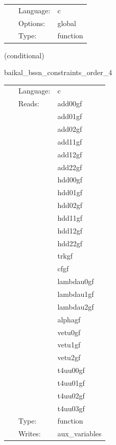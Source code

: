 \hspace{5mm}{\it register symmetries, the cartgrid3d way. } 


\hspace{5mm}

 \begin{tabular*}{160mm}{cll} 
~ & Language:  & c \\ 
~ & Options:  & global \\ 
~ & Type:  & function \\ 
\end{tabular*} 


\vspace{5mm}

   (conditional) 

\hspace{5mm} baikal\_bssn\_constraints\_order\_4 

\hspace{5mm}{\it compute bssn hamiltonian, momentum, and conformal connection constraints, at finite-differencing order 4 } 


\hspace{5mm}

 \begin{tabular*}{160mm}{cll} 
~ & Language:  & c \\ 
~ & Reads:  & add00gf \\ 
~& ~ &add01gf\\ 
~& ~ &add02gf\\ 
~& ~ &add11gf\\ 
~& ~ &add12gf\\ 
~& ~ &add22gf\\ 
~& ~ &hdd00gf\\ 
~& ~ &hdd01gf\\ 
~& ~ &hdd02gf\\ 
~& ~ &hdd11gf\\ 
~& ~ &hdd12gf\\ 
~& ~ &hdd22gf\\ 
~& ~ &trkgf\\ 
~& ~ &cfgf\\ 
~& ~ &lambdau0gf\\ 
~& ~ &lambdau1gf\\ 
~& ~ &lambdau2gf\\ 
~& ~ &alphagf\\ 
~& ~ &vetu0gf\\ 
~& ~ &vetu1gf\\ 
~& ~ &vetu2gf\\ 
~& ~ &t4uu00gf\\ 
~& ~ &t4uu01gf\\ 
~& ~ &t4uu02gf\\ 
~& ~ &t4uu03gf\\ 
~ & Type:  & function \\ 
~ & Writes:  & aux\_variables \\ 
\end{tabular*} 


